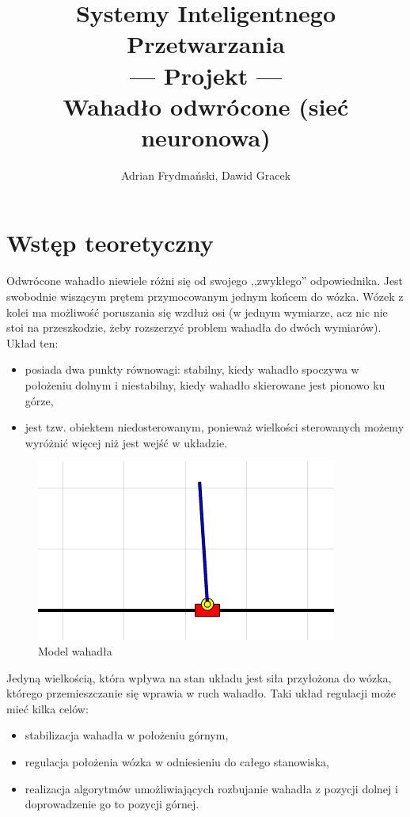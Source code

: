 \documentclass[10pt,a4paper,titlepage]{article}
\author{Adrian Frydmański, Dawid Gracek}
\title{Systemy Inteligentnego Przetwarzania\\--- Projekt ---\\Wahadło odwrócone (sieć neuronowa)}
\begin{document}
	\maketitle
	\clearpage
	\section{Wstęp teoretyczny}
	Odwrócone wahadło niewiele różni się od swojego ,,zwykłego'' odpowiednika. Jest swobodnie wiszącym prętem przymocowanym jednym końcem do wózka. Wózek z kolei ma możliwość poruszania się wzdłuż osi (w jednym wymiarze, acz nic nie stoi na przeszkodzie, żeby rozszerzyć problem wahadła do dwóch wymiarów). Układ ten:
	\begin{itemize}
		\item posiada dwa punkty równowagi: stabilny, kiedy wahadło spoczywa w położeniu dolnym i niestabilny, kiedy wahadło skierowane jest pionowo ku górze,
		\item jest tzw. obiektem niedosterowanym, ponieważ wielkości sterowanych możemy wyróżnić więcej niż jest wejść w układzie.
	\end{itemize}

	\begin{figure}[H]
		\center
		\includegraphics[width=.6\textwidth]{w.png}
		\caption{Model wahadła}
	\end{figure}
	
	Jedyną wielkością, która wpływa na stan układu jest siła przyłożona do wózka, którego przemieszczanie się wprawia w ruch wahadło. Taki układ regulacji może mieć kilka celów:
	\begin{itemize}
		\item stabilizacja wahadła w położeniu górnym,
		\item regulacja położenia wózka w odniesieniu do całego stanowiska,
		\item realizacja algorytmów umożliwiających rozbujanie wahadła z pozycji dolnej i doprowadzenie go to pozycji górnej.
	\end{itemize}
	
\end{document}
